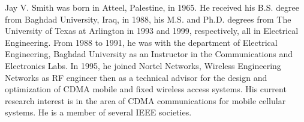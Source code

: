

{Jay V. Smith} was born in Atteel, Palestine, in 1965. He received
his B.S. degree from Baghdad University, Iraq, in 1988, his M.S.
and Ph.D. degrees from The University of Texas at Arlington in
1993 and 1999, respectively, all in Electrical Engineering. From
1988 to 1991, he was with the department of Electrical
Engineering, Baghdad University as an Instructor in the
Communications and Electronics Labs. In 1995, he joined Nortel
Networks, Wireless Engineering Networks as RF engineer then as a
technical advisor for the design and optimization of CDMA mobile
and fixed wireless access systems. His current research interest
is in the area of CDMA communications for mobile cellular systems.
He is a member of several IEEE societies.
